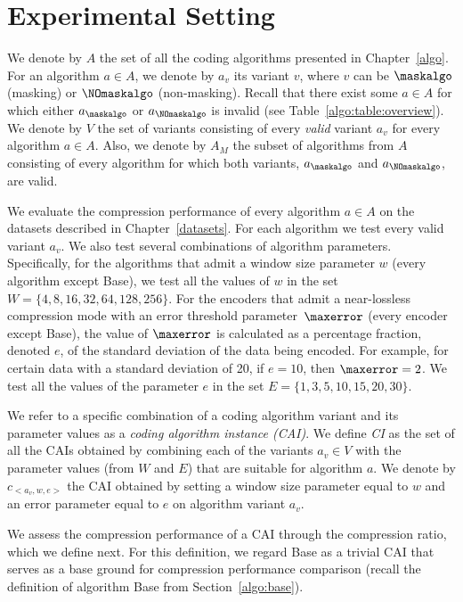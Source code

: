 
\clearpage
\section{Experimental Setting}
\label{experiments:experiments}


We denote by $A$ the set of all the coding algorithms presented in Chapter~\ref{algo}. For an algorithm $a \in A$, we denote by $a_v$ its variant $v$, where $v$ can be $\maskalgo$ (masking) or $\NOmaskalgo$ (non-masking). Recall that there exist some $a \in A$ for which either $a_\maskalgo$ or $a_\NOmaskalgo$ is invalid (see Table~\ref{algo:table:overview}). We denote by $V$ the set of variants consisting of every \textit{valid} variant $a_v$ for every algorithm $a \in A$. Also, we denote by $A_M$ the subset of algorithms from $A$ consisting of every algorithm for which both variants, $a_\maskalgo$ and $a_\NOmaskalgo$, are valid.


We evaluate the compression performance of every algorithm $a \in A$ on the datasets described in Chapter~\ref{datasets}. For each algorithm we test every valid variant $a_v$. We also test several combinations of algorithm parameters. Specifically, for the algorithms that admit a window size parameter $w$ (every algorithm except Base), we test all the values of $w$ in the set $W = \{4, 8, 16, 32, 64, 128, 256\}$. For the encoders that admit a near-lossless compression mode with an error threshold parameter~$\maxerror$ (every encoder except Base), the value of $\maxerror$ is calculated as a percentage fraction, denoted $e$, of the standard deviation of the data being encoded. For example, for certain data with a standard deviation of 20, if $e=10$, then $\maxerror=2$. We test all the values of the parameter $e$ in the set $E= \{1, 3, 5, 10, 15, 20, 30\}$. 


\vspace{+5pt}
\begin{defcion}
We refer to a specific combination of a coding algorithm variant and its parameter values as a \textit{coding algorithm instance (CAI)}. We define \textit{CI} as the set of all the CAIs obtained by combining each of the variants $a_v \in V$ with the parameter values (from $W$ and $E$) that are suitable for algorithm $a$. We denote by $c_{<a_v, w, e>}$ the CAI obtained by setting a window size parameter equal to $w$ and an error parameter equal to $e$ on algorithm variant $a_v$.
\end{defcion}


We assess the compression performance of a CAI through the compression ratio, which we define next. For this definition, we regard Base as a trivial CAI that serves as a base ground for compression performance comparison (recall the definition of algorithm Base from Section~\ref{algo:base}).


